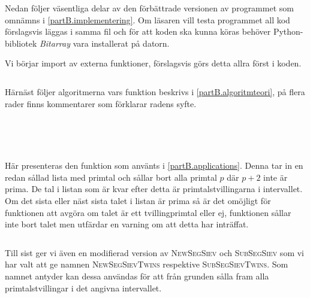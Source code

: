 \newcommand{\code}[1]{\inputminted[frame=lines,fontsize=\footnotesize,linenos]{python}{code/#1.py}}

Nedan följer väsentliga delar av den förbättrade versionen av programmet som omnämns i \ref{partB.implementering}.
Om läsaren vill testa programmet all kod förslagsvis läggas i samma fil och för att koden ska kunna köras behöver Python-bibliotek \textit{Bitarray} vara installerat på datorn.

Vi börjar import av externa funktioner, förslagsvis görs detta allra först i koden.
\code{imports}

Härnäst följer algoritmerna vars funktion beskrivs i \ref{partB.algoritmteori}, 
på flera rader finns kommentarer som förklarar radens syfte.
\code{SimpleSiev} %
\code{SimpleSegSiev} %
\code{SubSegSiev} %
\code{NewSegSiev} %
\code{DiophAppr} %

Här presenteras den funktion som använts i \ref{partB.applications}.
Denna tar in en redan sållad lista med primtal och sållar bort alla primtal $p$ där $p+2$ inte är prima.
De tal i listan som är kvar efter detta är primtalstvillingarna i intervallet.
Om det sista eller näst sista talet i listan är prima så är det omöjligt för funktionen att avgöra om talet är ett tvillingprimtal eller ej, funktionen sållar inte bort talet men utfärdar en varning om att detta har inträffat.
\code{RemoveNonTwins}\label{code.twins}

Till sist ger vi även en modifierad version av \textsc{NewSegSiev} och \textsc{SubSegSiev} som vi har valt att ge namnen
\textsc{NewSegSievTwins} respektive \textsc{SubSegSievTwins}.
Som namnet antyder kan dessa användas för att från grunden sålla fram alla primtalstvillingar i det angivna intervallet.
\code{SubSegSievTwins}
\code{NewSegSievTwins}